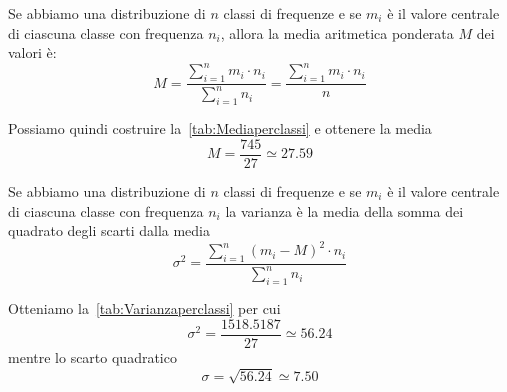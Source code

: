\begin{defn}
	Se abbiamo una distribuzione di $n$ classi di frequenze  e se $m_i$ è il valore centrale di ciascuna classe con frequenza $n_i$,  allora la media aritmetica ponderata  $M$ dei valori è: \[M=\dfrac{\sum_{i=1}^{n}m_{i}\cdot n_{i}}{\sum_{i=1}^{n} n_{i}}=\dfrac{\sum_{i=1}^{n}m_{i}\cdot n_{i}}{n}\]
\end{defn}
Possiamo quindi costruire la~\vref{tab:Mediaperclassi} e ottenere la media\[M=\dfrac{745}{27}\simeq\num{27.59}\]

\begin{defn}
		Se abbiamo una distribuzione di $n$ classi di frequenze  e se $m_i$ è il valore centrale di ciascuna classe con frequenza $n_i$
	la varianza  è la media della somma dei quadrato degli scarti dalla media\[\sigma^{2}=\dfrac{\sum_{i=1}^{n}(m_{i}-M)^{2}\cdot n_{i}}{\sum_{i=1}^{n} n_{i}}\] 
\end{defn}
Otteniamo la~\vref{tab:Varianzaperclassi} per cui \[\sigma^2=\dfrac{1518.5187}{27}\simeq\num{56.24}\]
mentre lo scarto quadratico 
\[\sigma=\sqrt{56.24}\simeq\num{7.50}\]